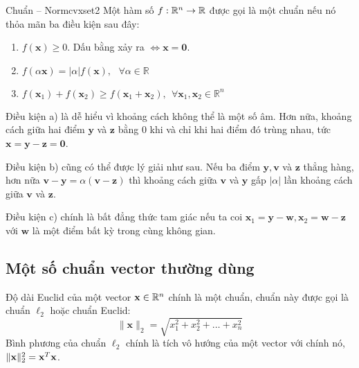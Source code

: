 \begin{mydef}{Chuẩn -- Norm}{cvxset2}
Một hàm số $f: \mathbb{R}^n \rightarrow \mathbb{R}$ được gọi là một chuẩn nếu nó thỏa mãn ba
điều kiện sau đây:
\begin{enumerate}

\item $f(\mathbf{x}) \geq 0$. Dấu bằng xảy ra $\Leftrightarrow \mathbf{x = 0} $.

\item $f(\alpha \mathbf{x}) = |\alpha| f(\mathbf{x}), ~~~\forall \alpha \in \mathbb{R}\ $

\item $f(\mathbf{x}_1) + f(\mathbf{x}_2) \geq f(\mathbf{x}_1 + \mathbf{x}_2),
~~\forall \mathbf{x}_1, \mathbf{x}_2 \in \mathbb{R}^n$

\end{enumerate}\end{mydef}

{Điều kiện a)} là dễ hiểu vì khoảng cách không thể là một số âm.
Hơn nữa, khoảng cách giữa hai điểm $\mathbf{y}$ và $\mathbf{z}$ bằng 0 khi và
chỉ khi hai điểm đó trùng nhau, tức $\mathbf{x = y - z = 0} $.

{Điều kiện b)} cũng có thể được lý giải như sau. Nếu ba điểm
$\mathbf{y, v}$ và $\mathbf{z}$ thẳng hàng, hơn nữa
$\mathbf{v - y} = \alpha (\mathbf{v - z}) $ thì khoảng cách giữa $\mathbf{v}$ và
$\mathbf{y}$ gấp $ |\alpha |$ lần khoảng cách giữa $\mathbf{v}$ và
$\mathbf{z}$.

{Điều kiện c)} chính là bất đẳng thức tam giác nếu ta coi
$\mathbf{x}_1 = \mathbf{y - w}, \mathbf{x}_2 = \mathbf{w - z} $ với
$\mathbf{w}$ là một điểm bất kỳ trong cùng không gian.



\subsection{Một số chuẩn vector thường dùng}
\label{sub:norms}


Độ dài Euclid của một vector $\mathbf{x} \in \mathbb{R}^n$ chính là một chuẩn, chuẩn này
được gọi là chuẩn $\ell_2$ hoặc chuẩn Euclid:
\begin{equation}
\label{eqn:norm2}
\|\mathbf{x}\|_2 = \sqrt{x_1^2 + x_2^2 + \dots + x_n^2}
\end{equation}
Bình phương của chuẩn $\ell_2$ chính là tích vô hướng của một vector với chính nó,
$\|\mathbf{x}\|_2^2 = \mathbf{x}^T\mathbf{x}$.

